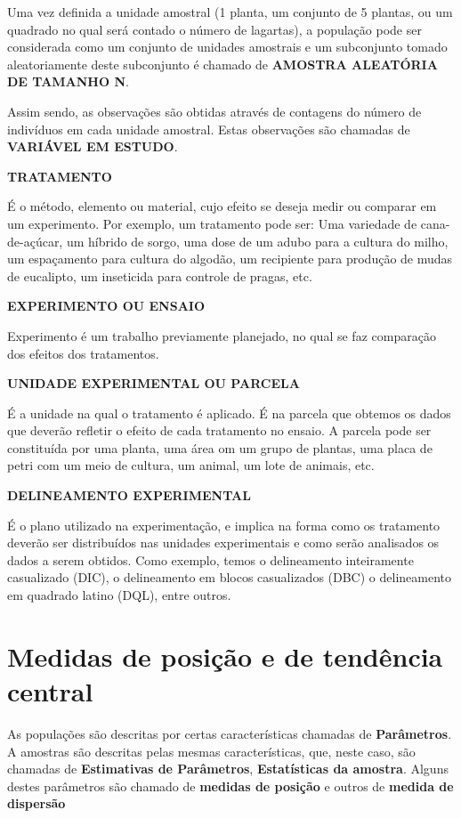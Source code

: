 \documentclass[
]{book}
\begin{document}
Uma vez definida a unidade amostral (1 planta, um conjunto de 5 plantas, ou um quadrado no qual será contado o número de lagartas), a população pode ser considerada como um conjunto de unidades amostrais e um subconjunto tomado aleatoriamente deste subconjunto é chamado de \textbf{AMOSTRA ALEATÓRIA DE TAMANHO N}.

Assim sendo, as observações são obtidas através de contagens do número de indivíduos em cada unidade amostral. Estas observações são chamadas de \textbf{VARIÁVEL EM ESTUDO}.

\textbf{TRATAMENTO}

É o método, elemento ou material, cujo efeito se deseja medir ou comparar em um experimento. Por exemplo, um tratamento pode ser: Uma variedade de cana-de-açúcar, um híbrido de sorgo, uma dose de um adubo para a cultura do milho, um espaçamento para cultura do algodão, um recipiente para produção de mudas de eucalipto, um inseticida para controle de pragas, etc.

\textbf{EXPERIMENTO OU ENSAIO}

Experimento é um trabalho previamente planejado, no qual se faz comparação dos efeitos dos tratamentos.

\textbf{UNIDADE EXPERIMENTAL OU PARCELA}

É a unidade na qual o tratamento é aplicado. É na parcela que obtemos os dados que deverão refletir o efeito de cada tratamento no ensaio. A parcela pode ser constituída por uma planta, uma área om um grupo de plantas, uma placa de petri com um meio de cultura, um animal, um lote de animais, etc.

\textbf{DELINEAMENTO EXPERIMENTAL}

É o plano utilizado na experimentação, e implica na forma como os tratamento deverão ser distribuídos nas unidades experimentais e como serão analisados os dados a serem obtidos. Como exemplo, temos o delineamento inteiramente casualizado (DIC), o delineamento em blocos casualizados (DBC) o delineamento em quadrado latino (DQL), entre outros.

\hypertarget{medidas-de-posiuxe7uxe3o-e-de-tenduxeancia-central}{%
\section{Medidas de posição e de tendência central}\label{medidas-de-posiuxe7uxe3o-e-de-tenduxeancia-central}}

As populações são descritas por certas características chamadas de \textbf{Parâmetros}. A amostras são descritas pelas mesmas características, que, neste caso, são chamadas de \textbf{Estimativas de Parâmetros}, \textbf{Estatísticas da amostra}. Alguns destes parâmetros são chamado de \textbf{medidas de posição} e outros de \textbf{medida de dispersão}
\end{document}

